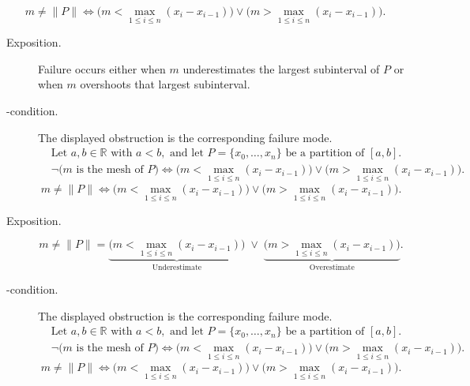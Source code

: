 \begin{remark*}
\[
m\neq\|P\|
\Longleftrightarrow
\bigl(m<\max_{1\le i\le n}(x_i - x_{i-1})\bigr)\lor\bigl(m>\max_{1\le i\le n}(x_i - x_{i-1})\bigr).
\]
\end{remark*}

\begin{remark*}
\begin{description}
  \item[Exposition.]
Failure occurs either when $m$ underestimates the largest subinterval of $P$ or when $m$ overshoots that largest subinterval.


  \item[\neq-condition.]
  The displayed obstruction is the corresponding failure mode.
  \[
\begin{aligned}
&\text{Let } a,b\in\mathbb{R} \text{ with } a<b, \text{ and let } P=\{x_0,\ldots,x_n\} \text{ be a partition of } [a,b].\\
&\neg\bigl(m \text{ is the mesh of } P\bigr)
\Longleftrightarrow
\bigl(m<\max_{1\le i\le n}(x_i - x_{i-1})\bigr)\lor\bigl(m>\max_{1\le i\le n}(x_i - x_{i-1})\bigr).
\end{aligned}
  \]
  \[
m\neq\|P\|
\Longleftrightarrow
\bigl(m<\max_{1\le i\le n}(x_i - x_{i-1})\bigr)\lor\bigl(m>\max_{1\le i\le n}(x_i - x_{i-1})\bigr).
  \]
\end{description}
\end{remark*}

\begin{remark*}
\begin{description}
  \item[Exposition.]
\[
m\neq\|P\|
=
\underbrace{\bigl(m<\max_{1\le i\le n}(x_i - x_{i-1})\bigr)}_{\text{Underestimate}}
\;\lor\;
\underbrace{\bigl(m>\max_{1\le i\le n}(x_i - x_{i-1})\bigr)}_{\text{Overestimate}}.
\]


  \item[\neq-condition.]
  The displayed obstruction is the corresponding failure mode.
  \[
\begin{aligned}
&\text{Let } a,b\in\mathbb{R} \text{ with } a<b, \text{ and let } P=\{x_0,\ldots,x_n\} \text{ be a partition of } [a,b].\\
&\neg\bigl(m \text{ is the mesh of } P\bigr)
\Longleftrightarrow
\bigl(m<\max_{1\le i\le n}(x_i - x_{i-1})\bigr)\lor\bigl(m>\max_{1\le i\le n}(x_i - x_{i-1})\bigr).
\end{aligned}
  \]
  \[
m\neq\|P\|
\Longleftrightarrow
\bigl(m<\max_{1\le i\le n}(x_i - x_{i-1})\bigr)\lor\bigl(m>\max_{1\le i\le n}(x_i - x_{i-1})\bigr).
  \]
\end{description}
\end{remark*}


